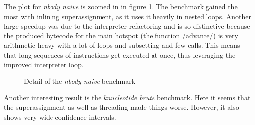 
The plot for \emph{nbody naive} is zoomed in in figure \ref{fig:nbody}. The benchmark gained the most with inlining superassignment, as it uses it heavily in nested loops. Another large speedup was due to the interpreter refactoring and is so distinctive because the produced bytecode for the main hotspot (the function \rinline/advance/) is very arithmetic heavy with a lot of loops and subsetting and few calls. This means that long sequences of instructions get executed at once, thus leveraging the improved interpreter loop.




\begin{figure}[htbp]
  \caption{\label{fig:nbody}Detail of the \emph{nbody naive} benchmark}
  \centering
\end{figure}

Another interesting result is the \emph{knucleotide brute} benchmark. Here it seems that the superassignment as well as threading made things worse. However, it also shows very wide confidence intervals.

